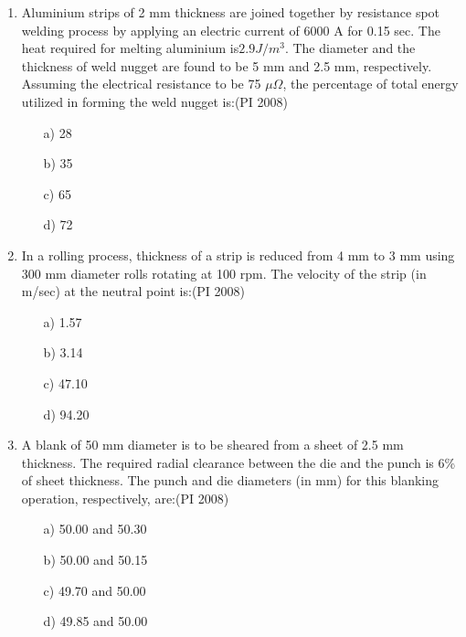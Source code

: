 \documentclass[journal,12pt,onecolumn]{IEEEtran}
\theoremstyle{remark}
\begin{document}
\begin{enumerate}
\item %
Aluminium strips of 2 mm thickness are joined together by resistance spot welding process by applying an electric current of 6000 A for 0.15 sec. The heat required for melting aluminium is$2.9J/m^3$. The diameter and the thickness of weld nugget are found to be 5 mm and 2.5 mm, respectively. Assuming the electrical resistance to be 75 $\mu\Omega$, the percentage of total energy utilized in forming the weld nugget is:\hfill{(PI 2008)}
\begin{multicols}{4}
    \begin{enumerate}
  \item[a)] 28
  \item[b)] 35
  \item[c)] 65
  \item[d)] 72
\end{enumerate}
\end{multicols}
\vspace{1cm}
\item %
In a rolling process, thickness of a strip is reduced from 4 mm to 3 mm using 300 mm diameter rolls rotating at 100 rpm. The velocity of the strip (in m/sec) at the neutral point is:\hfill{(PI 2008)}
\begin{multicols}{4}
    \begin{enumerate}
  \item[a)] 1.57
  \item[b)] 3.14
  \item[c)] 47.10
  \item[d)] 94.20
\end{enumerate}
\end{multicols}
\vspace{1cm}

\item %
A blank of 50 mm diameter is to be sheared from a sheet of 2.5 mm thickness. The required radial clearance between the die and the punch is 6\% of sheet thickness. The punch and die diameters (in mm) for this blanking operation, respectively, are:\hfill{(PI 2008)}
\begin{multicols}{4}
    \begin{enumerate}
  \item[a)] 50.00 and 50.30
  \item[b)] 50.00 and 50.15
  \item[c)] 49.70 and 50.00
  \item[d)] 49.85 and 50.00
\end{enumerate}
\end{multicols}
\vspace{1cm}


\end{enumerate}
\end{document}
